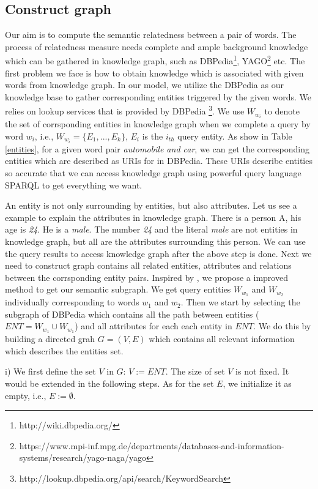 \subsection{Construct graph}
\label{sec:construct graph}
Our aim is to compute the semantic relatedness between a pair of words. The process of relatedness measure
needs complete and ample background knowledge which can be gathered in knowledge graph, such as
DBPedia\footnote{http://wiki.dbpedia.org/}, 
YAGO\footnote{https://www.mpi-inf.mpg.de/departments/databases-and-information-systems/research/yago-naga/yago} etc.
The first problem we face is how to obtain knowledge which is associated with given words from knowledge graph. 
In our model, we utilize the DBPedia as our knowledge base to gather corresponding entities triggered by the given words.
We relies on lookup services that is provided by DBPedia \footnote{http://lookup.dbpedia.org/api/search/KeywordSearch}. 
We use $W_{w_i}$ to denote the set of corrsponding entities in knowledge graph when we complete a query by word $w_i$,
i.e., $W_{w_i}=\{E_1,...,E_k\}$, $E_i$ is the $i_{th}$ query entity.
As show in Table \ref{entities}, for a given word pair \emph{automobile and car}, 
we can get the corresponding entities which are described as URIs for in DBPedia. 
These URIs describe entities so accurate that we can access knowledge graph using powerful query language SPARQL 
to get everything we want.

An entity is not only surrounding by entities, but also attributes. Let us see a example to explain the attributes 
in knowledge graph. There is a person A, his age is \emph{24}. He is a \emph{male}.
The number \emph{24} and the literal \emph{male} are not entities in knowledge graph,
but all are the attributes surrounding this person.
We can use the query results to access knowledge graph after the above step is done. Next we need to construct graph 
contains all related entities, attributes and relations between the corrsponding entity pairs. Inspired by \cite{aaai/NavigliP12},
we propose a improved method to get our semantic subgraph. We get query entities $W_{w_1}$ and $W_{w_2}$ individually
corresponding to words $w_1$ and $w_2$. 
Then we start by selecting the subgraph of DBPedia which contains all the path between entities
($ENT = W_{w_1} \cup W_{w_1}$) and all attributes for each each entity in $ENT$. We do 
this by building a directed grah ${G = (V, E)}$ which contains all relevant information which describes
the entities set.

i) We first define the set $V$ in $G$: $V:=ENT$. 
The size of set $V$ is not fixed. It would be extended in the following steps.
As for the set $E$, we initialize it as empty, i.e., $E:=\emptyset$.

